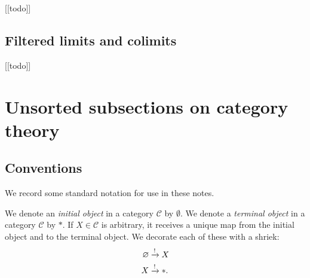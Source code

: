 \begin{center}
    [[todo]]    
\end{center}

\subsection{Filtered limits and colimits}

\begin{center}
    [[todo]]    
\end{center}




\section{Unsorted subsections on category theory}

\subsection{Conventions}

We record some standard notation for use in these notes.

\begin{notation}\label{nota:initial-terminal-objects} We denote an \textit{initial object} in a category $\mathscr{C}$ by $\emptyset$. We denote a \textit{terminal object} in a category $\mathscr{C}$ by $\ast$. If $X \in \mathscr{C}$ is arbitrary, it receives a unique map from the initial object and to the terminal object. We decorate each of these with a shriek:
\begin{align*}
    \varnothing &\xrightarrow{!} X \\
    X &\xrightarrow{!} \ast.
\end{align*}
\end{notation}


